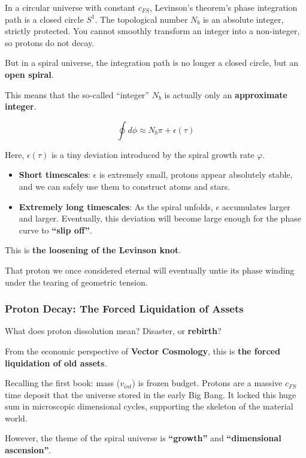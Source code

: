 In a circular universe with constant $c_{FS}$, Levinson's theorem's phase integration path is a closed circle $S^1$. The topological number $N_b$ is an absolute integer, strictly protected. You cannot smoothly transform an integer into a non-integer, so protons do not decay.

But in a spiral universe, the integration path is no longer a closed circle, but an \textbf{open spiral}.

This means that the so-called ``integer'' $N_b$ is actually only an \textbf{approximate integer}.

\[\oint d\phi \approx N_b \pi + \epsilon(\tau)\]

Here, $\epsilon(\tau)$ is a tiny deviation introduced by the spiral growth rate $\varphi$.

\begin{itemize}
\item \textbf{Short timescales}: $\epsilon$ is extremely small, protons appear absolutely stable, and we can safely use them to construct atoms and stars.

\item \textbf{Extremely long timescales}: As the spiral unfolds, $\epsilon$ accumulates larger and larger. Eventually, this deviation will become large enough for the phase curve to \textbf{``slip off''}.
\end{itemize}

This is \textbf{the loosening of the Levinson knot}.

That proton we once considered eternal will eventually untie its phase winding under the tearing of geometric tension.

\subsubsection{Proton Decay: The Forced Liquidation of Assets}

What does proton dissolution mean? Disaster, or \textbf{rebirth}?

From the economic perspective of \textbf{Vector Cosmology}, this is \textbf{the forced liquidation of old assets}.

Recalling the first book: mass ($v_{int}$) is frozen budget. Protons are a massive $c_{FS}$ time deposit that the universe stored in the early Big Bang. It locked this huge sum in microscopic dimensional cycles, supporting the skeleton of the material world.

However, the theme of the spiral universe is \textbf{``growth''} and \textbf{``dimensional ascension''}.

